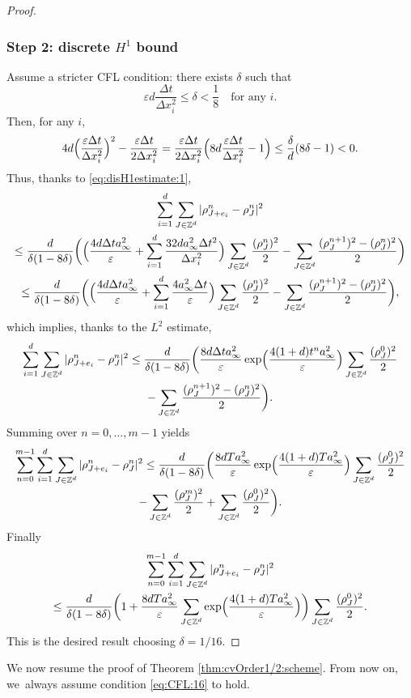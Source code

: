 \documentclass[11pt]{article}
\numberwithin{equation}{section}
\def\ZZ{\mathbb{Z}}
\def\eps{\varepsilon}
\def\dt{\Delta t}
\def\dx{\Delta x}
\theoremstyle{plain}
\theoremstyle{definition}
\begin{document}
\begin{proof}
\subsubsection*{Step 2: discrete $H^1$ bound}
Assume a stricter CFL condition: there exists $\delta$ such that
\begin{equation}\label{eq:CFL:16}
\eps d \frac{\dt}{\dx_i^2} \leq \delta < \frac 18 \quad \text{for any } i.
\end{equation}
Then, for any $i$,
\[
4d\Bigl(\frac{\eps \dt}{\dx_i^2}\Bigr)^2 - \frac{\eps \dt}{2\dx_i^2}
= \frac{\eps \dt}{2\dx_i^2}\Bigl(8d\frac{\eps \dt}{\dx_i^2} - 1\Bigr) \leq \frac{\delta}{d}(8\delta - 1) < 0.
\]
Thus, thanks to \ref{eq:disH1estimate:1},
\begin{multline*}
\sum_{i=1}^{d} \sum_{J \in \ZZ^d} |\rho_{J+e_i}^n - \rho_J^n|^2 \\
\leq
\frac{d}{\delta(1 - 8\delta)}\biggl(\Bigl(\frac{4d\dt a_\infty^2}{\eps} + \sum_{i=1}^{d} \frac{32 d a_\infty^2\dt^2}{\dx_i^2}\Bigr) \sum_{J\in\ZZ^d} \frac{(\rho_J^n)^2}{2}
- \sum_{J \in \ZZ^d} \frac{(\rho_J^{n+1})^2 -(\rho_J^n)^2}{2} \biggr) \\
\leq
\frac{d}{\delta(1 - 8\delta)}\biggl(\Bigl(\frac{4d\dt a_\infty^2}{\eps} + \sum_{i=1}^{d} \frac{4 a_\infty^2\dt}{\eps} \Bigr) \sum_{J\in\ZZ^d} \frac{(\rho_J^n)^2}{2}
- \sum_{J \in \ZZ^d} \frac{(\rho_J^{n+1})^2 -(\rho_J^n)^2}{2} \biggr),
\end{multline*}
which implies, thanks to the $L^2$ estimate,
\begin{multline*}
\sum_{i=1}^{d} \sum_{J \in \ZZ^d} |\rho_{J+e_i}^n - \rho_J^n|^2 \leq
\frac{d}{\delta(1 - 8\delta)} \biggl(\frac{8d\dt a_\infty^2}{\eps}
\exp\Bigl(\frac{4(1 + d)t^n a_\infty^2}{\eps}\Bigr) \sum_{J \in \ZZ^d} \frac{(\rho_J^0)^2}{2}
\\
- \sum_{J \in \ZZ^d} \frac{(\rho_J^{n+1})^2
-(\rho_J^n)^2}{2} \biggr).
\end{multline*}
Summing over $n=0,\ldots,m-1$ yields
\begin{multline*}
\sum_{n = 0}^{m-1} \sum_{i=1}^{d} \sum_{J \in \ZZ^d} |\rho_{J+e_i}^n - \rho_J^n|^2 \leq
\frac{d}{\delta(1 - 8\delta)} \biggl(\frac{8dT a_\infty^2}{\eps}
\exp\Bigl(\frac{4(1 + d)T a_\infty^2}{\eps}\Bigr) \sum_{J \in \ZZ^d} \frac{(\rho_J^0)^2}{2}
\\
 - \sum_{J \in \ZZ^d} \frac{(\rho_J^{m})^2}{2}
+ \sum_{J \in \ZZ^d} \frac{(\rho_J^0)^2}{2} \biggr).
\end{multline*}
Finally
\begin{multline*}
\sum_{n = 0}^{m-1} \sum_{i=1}^{d} \sum_{J \in \ZZ^d} |\rho_{J+e_i}^n - \rho_J^n|^2 \\
\leq
\frac{d}{\delta(1 - 8\delta)} \biggl(1 + \frac{8dT a_\infty^2}{\eps} \sum_{J\in\ZZ^d}
\exp\Bigl(\frac{4(1 + d)T a_\infty^2}{\eps} \Bigr)\biggr) \sum_{J \in \ZZ^d} \frac{(\rho_J^0)^2}{2}.
\end{multline*}
This is the desired result choosing $\delta = 1/16$.
\end{proof}
We now resume the proof of Theorem \ref{thm:cvOrder1/2:scheme}. From now on, we~always assume condition \eqref{eq:CFL:16} to hold.
\end{document}
